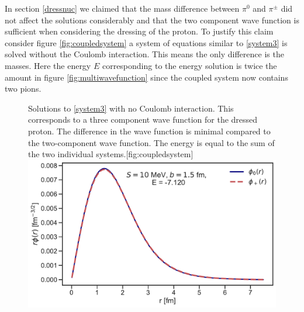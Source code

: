 In section \ref{dressnuc} we claimed that the mass difference between $\pi^0$ and $\pi^\pm$ did not affect the solutions considerably and that the two component wave function is sufficient when considering the dressing of the proton. To justify this claim consider figure \ref{fig:coupledsystem} a system of equations similar to \eqref{system3} is solved without the Coulomb interaction. This means the only difference is the masses. Here the energy $E$ corresponding to the energy solution is twice the amount in figure \ref{fig:multiwavefunction} since the coupled system now contains two pions. 
\begin{figure}[H]
	\begin{sidecaption}{Solutions to \eqref{system3} with no Coulomb interaction. This corresponds to a three component wave function for the dressed proton. The difference in the wave function is minimal compared to the two-component wave function. The energy is equal to the sum of the two individual systems.}[fig:coupledsystem]
		\includegraphics[width=\linewidth]{Figures/Integralplot_CoupledSystem.pdf}
	\end{sidecaption}
\end{figure}
